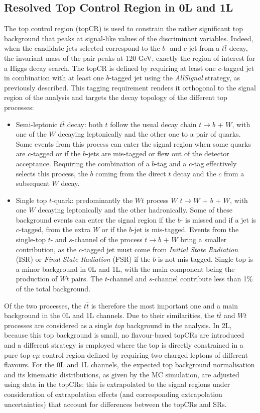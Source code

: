 \subsection{Resolved Top Control Region in 0L and 1L}
The top control region (topCR) is used to constrain the rather significant top background that peaks at signal-like values of the discriminant variables. Indeed, when the candidate jets selected correspond to the $b$- and $c$-jet from a $t\bar{t}$ decay, the invariant mass of the pair peaks at 120 GeV, exactly the region of interest for a Higgs decay search. The topCR is defined by requiring at least one $c$-tagged jet in combination with at least one $b$-tagged jet using the \textit{AllSignal} strategy, as previously described. This tagging requirement renders it orthogonal to the signal region of the analysis and targets the decay topology of the different top processes: 
\begin{itemize}
\item Semi-leptonic $t\bar{t}$ decay: both $t$ follow the usual decay chain  $t \rightarrow b$ + $W$, with one of the $W$ decaying leptonically and the other one to a pair of quarks. Some events from this process can enter the signal region when some quarks are $c$-tagged or if the $b$-jets are mis-tagged or flew out of the detector acceptance. Requiring the combination of a $b$-tag and a $c$-tag effectively selects this process, the $b$ coming from the direct $t$ decay and the $c$ from a subsequent $W$ decay. 
\item Single top $t$-quark: predominantly the $Wt$ process $W$ $t \rightarrow W$ +  $b$ + $W$, with one $W$ decaying leptonically and the other hadronically. Some of these background events can enter the signal region if the $b$- is missed and if a jet is $c$-tagged, from the extra $W$ or if the $b$-jet is mis-tagged. Events from the single-top $t$- and $s$-channel of the process $t \rightarrow b$ + $W$ bring a smaller contribution, as the $c$-tagged jet must come from \textit{Initial State Radiation} (ISR) or \textit{Final State Radiation} (FSR) if the $b$ is not mis-tagged. Single-top is a minor background in 0L and 1L, with the main component being the production of $Wt$ pairs. The $t$-channel and $s$-channel contribute less than 1\% of the total background.
\end{itemize}

Of the two processes, the $t\bar{t}$ is therefore the most important one and a main background in the 0L and 1L channels. Due to their similarities, the $t\bar{t}$ and $Wt$ processes are considered as a single \textit{top} background in the analysis. In 2L, because this top background is small, no flavour-based topCRs are introduced and a different strategy is employed where the top is directly constrained in a pure top-$e\mu$ control region defined by requiring two charged leptons of different flavours. For the 0L and 1L channels, the expected top background normalisation and its kinematic distributions, as given by the MC simulation, are adjusted using data in the topCRs; this is extrapolated to the signal regions under consideration of extrapolation effects (and corresponding extrapolation uncertainties) that account for differences between the topCRs and SRs. \\

